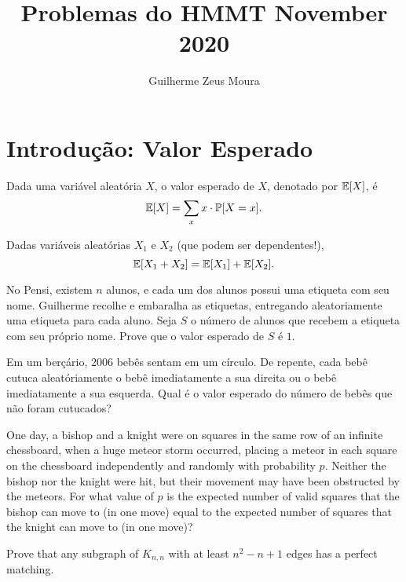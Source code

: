 \documentclass[10pt,a4paper]{article}
\title{Problemas do HMMT November 2020}
\author{Guilherme Zeus Moura}
\begin{document}
	
	\zeustitle

	\section{Introdução: Valor Esperado}

	\begin{defn}
		Dada uma variável aleatória $X$, o valor esperado de $X$, denotado por $\mathbb{E}[X]$, é \[ \mathbb{E}[X] = 
		\sum_{x} x \cdot \mathbb{P}[X = x].\]	
	\end{defn}

	\begin{thm}
		Dadas variáveis aleatórias $X_1$ e $X_2$ (que podem ser dependentes!), \[\mathbb{E}[X_1 + X_2] = \mathbb{E}[X_1] + \mathbb{E}[X_2].\]
	\end{thm}

	\begin{prob}
		No Pensi, existem $n$ alunos, e cada um dos alunos possui uma etiqueta com seu nome. Guilherme recolhe e embaralha as etiquetas, entregando aleatoriamente uma etiqueta para cada aluno. Seja $S$ o número de alunos que recebem a etiqueta com seu próprio nome. Prove que o valor esperado de $S$ é $1$.
	\end{prob}

	\begin{prob}
		Em um berçário, $2006$ bebês sentam em um círculo. De repente, cada bebê cutuca aleatóriamente o bebê imediatamente a sua direita ou o bebê imediatamente a sua esquerda. Qual é o valor esperado do número de bebês que não foram cutucados?
	\end{prob}

	\begin{prob}[NIMO 4.3]
One day, a bishop and a knight were on squares in the same row of an infinite chessboard, when a huge meteor storm occurred, placing a meteor in each square on the chessboard independently and randomly with probability $p$.
Neither the bishop nor the knight were hit, but their movement may have been obstructed by the meteors.
For what value of $p$ is the expected number of valid squares that the bishop can move to (in one move) equal to the expected number of squares that the knight can move to (in one move)?
	\end{prob}

	\begin{prob}
		Prove that any subgraph of $K_{n,n}$ with at least $n^2 - n+1$ edges has a perfect matching.
	\end{prob}
	
\end{document}
